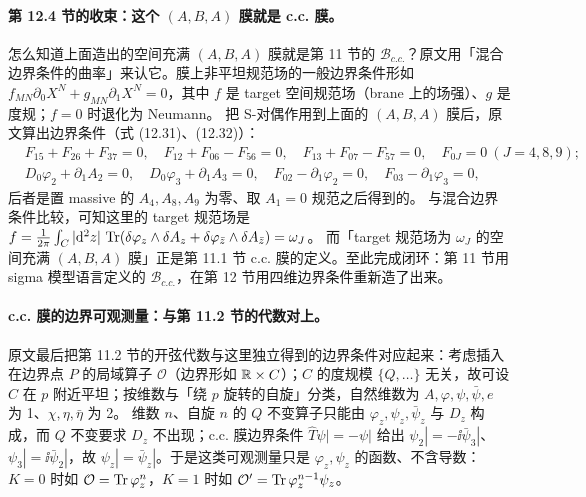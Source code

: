 \paragraph{第 12.4 节的收束：这个 \((A,B,A)\) 膜就是 c.c. 膜。}怎么知道上面造出的空间充满 \((A,B,A)\) 膜就是第 11 节的 \(\mathcal B_{c.c.}\)？原文用「混合边界条件的曲率」来认它。膜上非平坦规范场的一般边界条件形如 \(f_{MN}\partial_0X^N+g_{MN}\partial_1X^N=0\)，其中 \(f\) 是 target 空间规范场（brane 上的场强）、\(g\) 是度规；\(f=0\) 时退化为 Neumann。\pA{} 把 S-对偶作用到上面的 \((A,B,A)\) 膜后，原文算出边界条件（式 (12.31)、(12.32)）：
\begin{align}
&F_{15}+F_{26}+F_{37}=0,\quad
F_{12}+F_{06}-F_{56}=0,\quad
F_{13}+F_{07}-F_{57}=0,\quad F_{0J}=0\ (J=4,8,9);\label{eq:ABA-S}\\
&D_0\varphi_2+\partial_1A_2=0,\quad
D_0\varphi_3+\partial_1A_3=0,\quad
F_{02}-\partial_1\varphi_2=0,\quad
F_{03}-\partial_1\varphi_3=0,\label{eq:ABA-32}
\end{align}
后者是置 massive 的 \(A_4,A_8,A_9\) 为零、取 \(A_1=0\) 规范之后得到的。\pA{} 与混合边界条件比较，可知这里的 target 规范场是 \(f=\frac{1}{2\pi}\int_C|\mathrm{d}^2z|\,\operatorname{Tr}(\delta\varphi_z\wedge\delta A_z+\delta\varphi_{\bar z}\wedge\delta A_{\bar z})=\omega_J\)。\pA{} 而「target 规范场为 \(\omega_J\) 的空间充满 \((A,B,A)\) 膜」正是第 11.1 节 c.c. 膜的定义。至此完成闭环：第 11 节用 sigma 模型语言定义的 \(\mathcal B_{c.c.}\)，在第 12 节用四维边界条件重新造了出来。

\paragraph{c.c. 膜的边界可观测量：与第 11.2 节的代数对上。}原文最后把第 11.2 节的开弦代数与这里独立得到的边界条件对应起来：考虑插入在边界点 \(P\) 的局域算子 \(\mathcal O\)（边界形如 \(\mathbb{R}\times C\)）；\(C\) 的度规模 \(\{Q,\dots\}\) 无关，故可设 \(C\) 在 \(p\) 附近平坦；按维数与「绕 \(p\) 旋转的自旋」分类，自然维数为 \(A,\varphi,\psi,\bar\psi,e\) 为 1、\(\chi,\eta,\bar\eta\) 为 2。\pA{} 维数 \(n\)、自旋 \(n\) 的 \(Q\) 不变算子只能由 \(\varphi_z,\psi_z,\bar\psi_z\) 与 \(D_z\) 构成，而 \(Q\) 不变要求 \(D_z\) 不出现；c.c. 膜边界条件 \(\hat T\psi|=-\psi|\) 给出 \(\psi_2|=-\ii\bar\psi_3|\)、\(\psi_3|=\ii\bar\psi_2|\)，故 \(\psi_z|=\bar\psi_z|\)。于是这类可观测量只是 \(\varphi_z,\psi_z\) 的函数、不含导数：\(K=0\) 时如 \(\mathcal O=\operatorname{Tr}\varphi_z^n\)，\(K=1\) 时如 \(\mathcal O'=\operatorname{Tr}\varphi_z^{n-1}\psi_z\)。\pA{}

